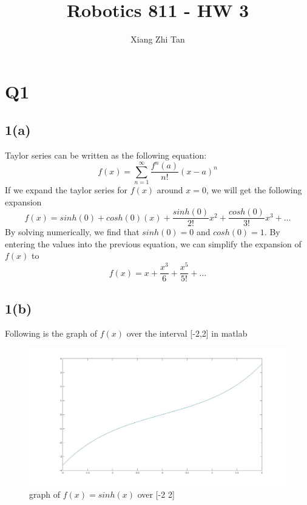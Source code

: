 \documentclass{article}
\begin{document}
\title{Robotics 811 - HW 3}
\author{Xiang Zhi Tan}
\maketitle

\section{Q1}
\subsection*{1(a)}
Taylor series can be written as the following equation:
\begin{equation*}
f(x) = \sum_{n=1}^{\infty}\frac{f^n(a)}{n!}(x -a)^n
\end{equation*}
If we expand the taylor series for $f(x)$ around $x=0$, we will get the following expansion
\begin{equation*}
f(x) = sinh(0) + cosh(0)(x) + \frac{sinh(0)}{2!}x^2 + \frac{cosh(0)}{3!}x^3 + \ldots
\end{equation*}
By solving numerically, we find that $sinh(0) = 0$ and $cosh(0) = 1$. By entering the values into the previous equation, we can simplify the expansion of $f(x)$ to
\begin{equation*}
f(x) = x + \frac{x^3}{6} + \frac{x^5}{5!} + \ldots
\end{equation*}
\subsection*{1(b)}
Following is the graph of $f(x)$ over the interval [-2,2] in matlab
\begin{figure}[H]
\centering
\includegraphics[width=6in]{figures/q1_b.jpg}
\caption{graph of $f(x) = sinh(x)$ over [-2 2]}
\end{figure}
\end{document}
